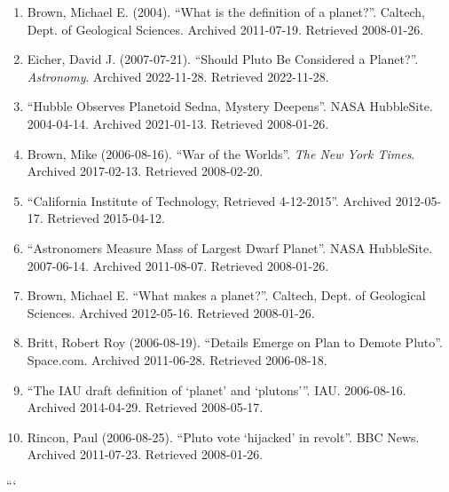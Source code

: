 \begin{enumerate}
\item Brown, Michael E. (2004). “What is the definition of a planet?”. Caltech, Dept. of Geological Sciences. Archived 2011-07-19. Retrieved 2008-01-26.

\item Eicher, David J. (2007-07-21). “Should Pluto Be Considered a Planet?”. \textit{Astronomy}. Archived 2022-11-28. Retrieved 2022-11-28.

\item “Hubble Observes Planetoid Sedna, Mystery Deepens”. NASA HubbleSite. 2004-04-14. Archived 2021-01-13. Retrieved 2008-01-26.

\item Brown, Mike (2006-08-16). “War of the Worlds”. \textit{The New York Times}. Archived 2017-02-13. Retrieved 2008-02-20.

\item “California Institute of Technology, Retrieved 4-12-2015”. Archived 2012-05-17. Retrieved 2015-04-12.

\item “Astronomers Measure Mass of Largest Dwarf Planet”. NASA HubbleSite. 2007-06-14. Archived 2011-08-07. Retrieved 2008-01-26.

\item Brown, Michael E. “What makes a planet?”. Caltech, Dept. of Geological Sciences. Archived 2012-05-16. Retrieved 2008-01-26.

\item Britt, Robert Roy (2006-08-19). “Details Emerge on Plan to Demote Pluto”. Space.com. Archived 2011-06-28. Retrieved 2006-08-18.

\item “The IAU draft definition of ‘planet’ and ‘plutons’”. IAU. 2006-08-16. Archived 2014-04-29. Retrieved 2008-05-17.

\item Rincon, Paul (2006-08-25). “Pluto vote ‘hijacked’ in revolt”. BBC News. Archived 2011-07-23. Retrieved 2008-01-26.
\end{enumerate}
```



